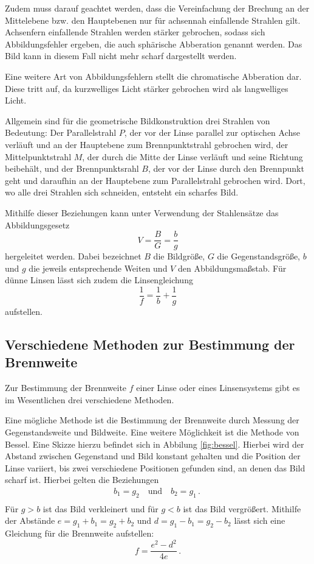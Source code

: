 Zudem muss darauf geachtet werden, dass die Vereinfachung der Brechung an der
Mittelebene bzw. den Hauptebenen nur für achsennah einfallende Strahlen gilt. Achsenfern
einfallende Strahlen werden stärker gebrochen, sodass sich Abbildungsfehler ergeben,
die auch sphärische Abberation genannt werden. Das Bild kann in diesem Fall nicht mehr scharf
dargestellt werden.

Eine weitere Art von Abbildungsfehlern stellt die chromatische Abberation dar. Diese
tritt auf, da kurzwelliges Licht stärker gebrochen wird als langwelliges Licht.

Allgemein sind für die geometrische Bildkonstruktion drei Strahlen von Bedeutung:
Der Parallelstrahl $P$, der vor der Linse parallel zur optischen Achse verläuft und an
der Hauptebene zum Brennpunktstrahl gebrochen wird, der Mittelpunktstrahl $M$, der
durch die Mitte der Linse verläuft und seine Richtung beibehält, und der Brennpunktsrahl
$B$, der vor der Linse durch den Brennpunkt geht und daraufhin an der Hauptebene zum Parallelstrahl
gebrochen wird. Dort, wo alle drei Strahlen sich schneiden, entsteht ein scharfes Bild.

Mithilfe dieser Beziehungen kann unter Verwendung der Stahlensätze das Abbildungsgesetz
\begin{equation}
  V=\frac{B}{G}=\frac{b}{g}
  \label{eqn:V}
\end{equation}
hergeleitet werden. Dabei bezeichnet $B$ die Bildgröße, $G$ die Gegenstandsgröße,
$b$ und $g$ die jeweils entsprechende Weiten und $V$ den Abbildungsmaßstab.
Für dünne Linsen lässt sich zudem die Linsengleichung
\begin{equation}
  \frac{1}{f}=\frac{1}{b}+\frac{1}{g}
  \label{eqn:linsengleichung}
\end{equation}
aufstellen.


\subsection{Verschiedene Methoden zur Bestimmung der Brennweite}
\label{subsec:Methoden}

Zur Bestimmung der Brennweite $f$ einer Linse oder eines Linsensystems gibt es im
Wesentlichen drei verschiedene Methoden.

Eine mögliche Methode ist die Bestimmung der Brennweite durch Messung der Gegenstandsweite
und Bildweite.
Eine weitere Möglichkeit ist die Methode von Bessel. Eine Skizze hierzu befindet sich in
Abbilung \ref{fig:bessel}. Hierbei wird der Abstand zwischen
Gegenstand und Bild konstant gehalten und die Position der Linse variiert, bis zwei
verschiedene Positionen gefunden sind, an denen das Bild scharf ist. Hierbei gelten die
Beziehungen
\begin{align}
  b_1=g_2 \quad \text{und} \quad b_2=g_1\,.\ \\
  \label{eqn:d}
\end{align}
Für $g>b$ ist das Bild verkleinert und für $g<b$ ist das Bild vergrößert. Mithilfe der
Abstände $e=g_1+b_1=g_2+b_2$ und $d=g_1-b_1=g_2-b_2$ lässt sich eine Gleichung für die
Brennweite aufstellen:
\begin{equation}
  f=\frac{e^2-d^2}{4e} \,.
  \label{eqn:bessel}
\end{equation}

